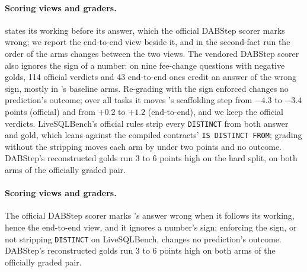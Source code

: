\paragraph{Scoring views and graders.}\label{sec:threats-golds} \mQwen{} states its working before
its answer, which the official DABStep scorer marks wrong; we report the
end-to-end view beside it, and in the second-fact run the order of the arms
changes between the two views. The vendored DABStep scorer also ignores the
sign of a number: on nine fee-change questions with negative golds, 114
official verdicts and 43 end-to-end ones credit an answer of the wrong
sign, mostly in \mQwen{}'s baseline arms. Re-grading with the sign enforced
changes no prediction's outcome; over all tasks it moves \mQwen{}'s
scaffolding step from $-4.3$ to $-3.4$ points (official) and from $+0.2$ to
$+1.2$ (end-to-end), and we keep the official verdicts. LiveSQLBench's official
rules strip every \texttt{DISTINCT} from both answer and gold, which leans
against the compiled contracts' \texttt{IS DISTINCT FROM}; grading without
the stripping moves each arm by under two points and no outcome. DABStep's
reconstructed golds run 3 to 6 points high on the hard split, on both
arms of the officially graded pair.
\else
\paragraph{Scoring views and graders.}\label{sec:threats-golds} The
official DABStep scorer marks \mQwen{}'s answer wrong when it follows its
working, hence the end-to-end view, and it ignores a number's sign;
enforcing the sign, or not stripping \texttt{DISTINCT} on LiveSQLBench,
changes no prediction's outcome. DABStep's reconstructed golds run 3 to 6
points high on both arms of the officially graded pair.
\fi


